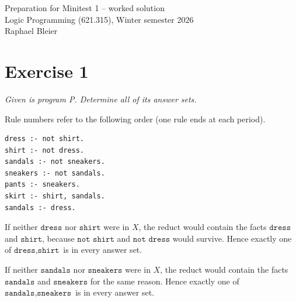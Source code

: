 \documentclass[a4paper,11pt]{article}
\newif\ifexplain
\newcommand{\explain}[1]{\ifexplain\begin{erklbox}#1\end{erklbox}\fi}
\newcommand{\angabe}[1]{\textit{#1}\par}
\newcommand{\aufgabe}[1]{\section*{Exercise #1}}
\newcommand{\at}[1]{\texttt{#1}}
\begin{document}
\begin{center}{\Large Preparation for Minitest 1 -- worked solution}\\Logic Programming (621.315), Winter semester 2026\\Raphael Bleier\end{center}
\explain{Dieses Dokument ist die ausgearbeitete Vorbereitung für den ersten Minitest. Zwei Begriffe tragen alles: Das \emph{Redukt} $P^X$ eines Programms $P$ bzgl.\ einer Kandidatenmenge $X$ entsteht, indem man jede Regel streicht, in der ein default-negiertes Atom aus $X$ vorkommt, und die übrigen Default-Negationen weglässt. $X$ ist genau dann ein Answer Set (stabiles Modell), wenn $X$ die kleinste abgeschlossene Menge $\operatorname{Cn}(P^X)$ des Redukts ist. Default-Negation \texttt{not a} ist keine Verneinung im klassischen Sinn: Sie prüft nur, ob \texttt{a} im Kandidaten fehlt. Fakten sind Regeln mit leerem Körper.}
\aufgabe{1}
\angabe{Given is program P. Determine all of its answer sets.}
Rule numbers refer to the following order (one rule ends at each period).
\begin{small}
\begin{verbatim}
dress :- not shirt.
shirt :- not dress.
sandals :- not sneakers.
sneakers :- not sandals.
pants :- sneakers.
skirt :- shirt, sandals.
sandals :- dress.
\end{verbatim}
\end{small}
\explain{Wir suchen zuerst, welche Kombinationen überhaupt infrage kommen, und prüfen dann jeden Kandidaten mit dem Redukt. Die Regeln 1 und 2 bzw.\ 3 und 4 streuen sich gegenseitig mit Default-Negation. Ein positiver Kreis wie \texttt{pants :- sneakers} ohne Startfact liefert nichts.}
If neither $\at{dress}$ nor $\at{shirt}$ were in $X$, the reduct would contain the facts $\at{dress}$ and $\at{shirt}$, because $\at{not shirt}$ and $\at{not dress}$ would survive. Hence exactly one of $\at{dress},\at{shirt}$ is in every answer set.
\explain{Hier ist der Kern der Default-Negation: Steht \texttt{not shirt} im Körper und ist \texttt{shirt} nicht im Kandidaten, bleibt nach dem Streichen der Negation nur noch der Kopf zurück, also ein Fact. Der Fact landet in $\operatorname{Cn}$ und widerspricht der Annahme.}
If neither $\at{sandals}$ nor $\at{sneakers}$ were in $X$, the reduct would contain the facts $\at{sandals}$ and $\at{sneakers}$ for the same reason. Hence exactly one of $\at{sandals},\at{sneakers}$ is in every answer set.
\explain{Gleiche Argumentation wie eben, nur mit dem zweiten Regelpaar. Solche gegenseitigen Ausschlusspaare erzeugen die Verzweigungen im Suchbaum.}
\end{document}
